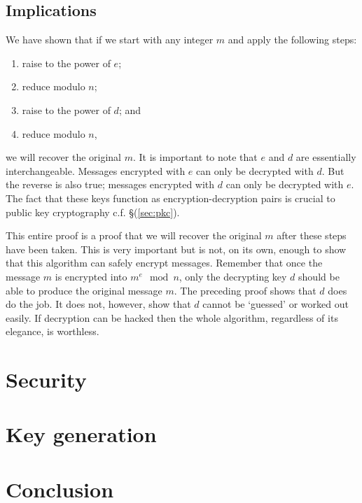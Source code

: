 \documentclass[]{scrartcl}
\theoremstyle{definition}
\renewcommand{\sec}[1]{\S \ref{#1}}
\let\oldref\ref
\renewcommand{\ref}[1]{(\oldref{#1})}
\begin{document}
\subsection{Implications}
We have shown that if we start with any integer $m$ and apply the following steps:
\begin{enumerate}
    \item raise to the power of $e$;
    \item reduce modulo $n$;
    \item raise to the power of $d$; and
    \item reduce modulo $n$,
\end{enumerate}
we will recover the original $m$. It is important to note that $e$ and $d$ are essentially interchangeable. Messages encrypted with $e$ can only be decrypted with $d$. But the reverse is also true; messages encrypted with $d$ can only be decrypted with $e$. The fact that these keys function as encryption-decryption pairs is crucial to public key cryptography c.f. \sec{sec:pkc}.

This entire proof is a proof that we will recover the original $m$ after these steps have been taken. This is very important but is not, on its own, enough to show that this algorithm can safely encrypt messages. Remember that once the message $m$ is encrypted into $m^e \mod n$, only the decrypting key $d$ should be able to produce the original message $m$. The preceding proof shows that $d$ does do the job. It does not, however, show that $d$ cannot be `guessed' or worked out easily. If decryption can be hacked then the whole algorithm, regardless of its elegance, is worthless.

\section{Security}

\section{Key generation}

\section{Conclusion}
\end{document}
